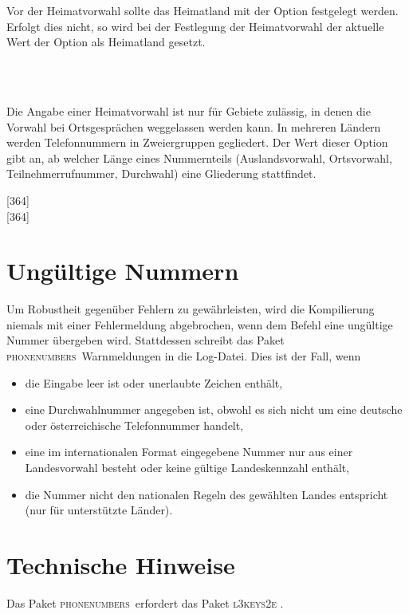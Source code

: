 \documentclass[numbers=noenddot]{scrreprt}
\newcommand*\Paket[1]{\textsc{#1}}
\newcommand\phone{\textcolor{cnltx}{\Paket{phone\-numbers}}}
\newcommand\UeberschriftUngueltig{\section{Ungültige Nummern}}
\begin{document}
\begin{Befehlsliste}
Vor der Heimatvorwahl sollte das Heimatland mit der Option  festgelegt werden. Erfolgt dies nicht, so wird bei der Festlegung der Heimatvorwahl der aktuelle Wert der Option  als Heimatland gesetzt.
\begin{sidebyside}
   \\
   \\
\end{sidebyside}
Die Angabe einer Heimatvorwahl ist nur für Gebiete zulässig, in denen die Vorwahl bei Ortsgesprächen weggelassen werden kann.
In mehreren Ländern werden Telefonnummern in Zweiergruppen gegliedert. Der Wert dieser Option gibt an, ab welcher Länge eines Nummernteils (Auslandsvorwahl, Ortsvorwahl, Teilnehmerrufnummer, Durchwahl) eine Gliederung stattfindet.
\begin{sidebyside}
  [364] \\
  [364]
\end{sidebyside}
\end{Befehlsliste}

\UeberschriftUngueltig
Um Robustheit gegenüber Fehlern zu gewährleisten, wird die Kompilierung niemals mit einer Fehlermeldung abgebrochen, wenn dem Befehl  eine ungültige Nummer übergeben wird. Stattdessen schreibt das Paket \phone\ Warnmeldungen in die Log-Datei.
Dies ist der Fall, wenn
\begin{itemize}
\item die Eingabe leer ist oder unerlaubte Zeichen enthält,
\item eine Durchwahlnummer angegeben ist, obwohl es sich nicht um eine deutsche oder österreichische Telefonnummer handelt,
\item eine im internationalen Format eingegebene Nummer nur aus einer Landesvorwahl besteht oder keine gültige Landeskennzahl enthält,
\item die Nummer nicht den nationalen Regeln des gewählten Landes entspricht (nur für unterstützte Länder).
\end{itemize}

\section{Technische Hinweise}
Das Paket \phone\ erfordert das Paket
\Paket{l3keys2e}
.
\end{document}
